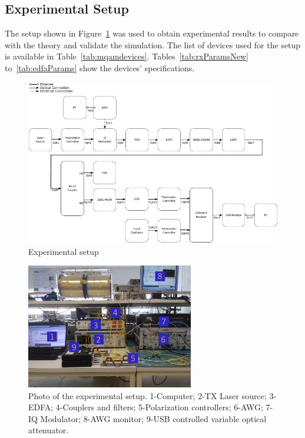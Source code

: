 \clearpage

\subsection{Experimental Setup}
	The setup shown in Figure~\ref{fig:experimental_mqam_setup} was used to obtain
	experimental results to compare with the theory and validate the simulation. The
	list of devices used for the setup is available in Table~\ref{tab:mqamdevices}.
	Tables~\ref{tab:rxParamsNew} to~\ref{tab:edfaParams} show the devices'
	specifications.
	\begin{figure}[H]
		\centering
		\includegraphics[width=\textwidth]{./sdf/m_qam_system/figures/experimental/experimentalSetup/mqamExperimental.pdf}
		\caption{Experimental setup}
		\label{fig:experimental_mqam_setup}
	\end{figure}
	\begin{figure}[H]
		\centering
		\includegraphics[width=0.65\textwidth]{./sdf/m_qam_system/figures/experimental/experimentalSetup/setupLeft.jpg}
		\caption{Photo of the experimental setup. 1-Computer; 2-TX Laser source; 3-EDFA; 4-Couplers and filters;
		5-Polarization controllers; 6-AWG; 7-IQ Modulator; 8-AWG monitor; 9-USB controlled variable optical attenuator.}
		\label{fig:experimental_mqam_setup_photo_left}
	\end{figure}
